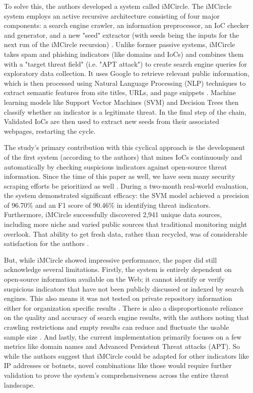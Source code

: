\documentclass[conference]{IEEEtran}
\begin{document}
To solve this, the authors developed a system called iMCircle.
The iMCircle system employs an active recursive architecture consisting of four major components: a search engine crawler, an information preprocessor, an IoC checker and generator, and a new "seed" extractor (with seeds being the inputs for the next run of the iMCircle recursion) \cite{zhang1}.
Unlike former passive systems, iMCircle takes spam and phishing indicators (like domains and IoCs) and combines them with a "target threat field" (i.e. "APT attack") to create search engine queries for exploratory data collection.
It uses Google to retrieve relevant public information, which is then processed using Natural Language Processing (NLP) techniques to extract semantic features from site titles, URLs, and page snippets \cite{zhang1}.
Machine learning models like Support Vector Machines (SVM) and Decision Trees then classify whether an indicator is a legitimate threat.
In the final step of the chain, Validated IoCs are then used to extract new seeds from their associated webpages, restarting the cycle.

The study's primary contribution with this cyclical approach is the development of the first system (according to the authors) that mines IoCs continuously and automatically by checking suspicious indicators against open-source threat information. Since the time of this paper as well, we have seen many security scraping efforts be prioritized as well \cite{zhang1}. During a two-month real-world evaluation, the system demonstrated significant efficacy: the SVM model achieved a precision of 96.70\% and an F1 score of 90.46\% in identifying threat indicators. Furthermore, iMCircle successfully discovered 2,941 unique data sources, including more niche and varied public sources that traditional monitoring might overlook. That ability to get fresh data, rather than recycled, was of considerable satisfaction for the authors \cite{zhang1}.

But, while iMCircle showed impressive performance, the paper did still acknowledge several limitations.
Firstly, the system is entirely dependent on open-source information available on the Web; it cannot identify or verify suspicious indicators that have not been publicly discussed or indexed by search engines.
This also means it was not tested on private repository information either for organization specific results \cite{zhang1}.
There is also a disproportionate reliance on the quality and accuracy of search engine results, with the authors noting that crawling restrictions and empty results can reduce and fluctuate the usable sample size \cite{zhang1}.
And lastly, the current implementation primarily focuses on a few metrics like domain names and Advanced Persistent Threat attacks (APT).
So while the authors suggest that iMCircle could  be adapted for other indicators like IP addresses or botnets, novel combinations like those would require further validation to prove the system's comprehensiveness across the entire threat landscape.
\end{document}
